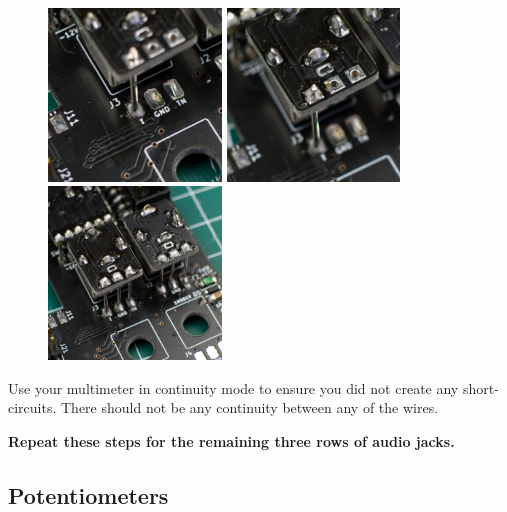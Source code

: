 \documentclass[12pt, a4paper]{article}
\begin{document}
\begin{figure}[H]
    \centering
    \includegraphics[width=46mm]{images/section_3-3_single_bot.jpg}
    \hspace{2mm}
    \includegraphics[width=46mm]{images/section_3-3_single_top.jpg}
    \hspace{2mm}
    \includegraphics[width=46mm]{images/section_3-3_full.jpg}
\end{figure}

Use your multimeter in continuity mode to ensure you did not create any short-circuits. There
should not be any continuity between any of the wires.

\textbf{Repeat these steps for the remaining three rows of audio jacks.}

\subsection{Potentiometers}
\end{document}

